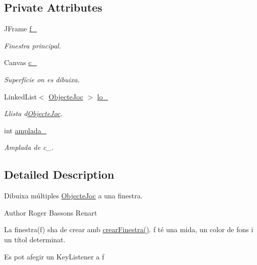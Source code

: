\subsection*{Private Attributes}
\begin{DoxyCompactItemize}
\item 
J\+Frame \hyperlink{class_dibuixador_asteroides_acd1dc7eee6ddda629759fc422566b11b}{f\+\_\+}
\begin{DoxyCompactList}\small\item\em Finestra principal. \end{DoxyCompactList}\item 
Canvas \hyperlink{class_dibuixador_asteroides_a634f3d95d02d08c9d21d2eef2c3bb410}{c\+\_\+}
\begin{DoxyCompactList}\small\item\em Superfície on es dibuixa. \end{DoxyCompactList}\item 
Linked\+List$<$ \hyperlink{interface_objecte_joc}{Objecte\+Joc} $>$ \hyperlink{class_dibuixador_asteroides_aafc049ca18d07bf9cf5f61b7e8e1e06f}{lo\+\_\+}
\begin{DoxyCompactList}\small\item\em Llista d\textquotesingle{}\hyperlink{interface_objecte_joc}{Objecte\+Joc}. \end{DoxyCompactList}\item 
int \hyperlink{class_dibuixador_asteroides_ac5680a5fd826ac9a412b9739f5f64a12}{amplada\+\_\+}
\begin{DoxyCompactList}\small\item\em Amplada de c\+\_\+. \end{DoxyCompactList}\end{DoxyCompactItemize}


\subsection{Detailed Description}
Dibuixa múltiples \hyperlink{interface_objecte_joc}{Objecte\+Joc} a una finestra. 

\begin{DoxyAuthor}{Author}
Roger Bassons Renart
\end{DoxyAuthor}
La finestra(f) s\textquotesingle{}ha de crear amb \hyperlink{class_dibuixador_asteroides_a54a43290703d14aee21e5c87a5e6fc5b}{crear\+Finestra()}. f té una mida, un color de fons i un títol determinat.

Es pot afegir un Key\+Listener a f

